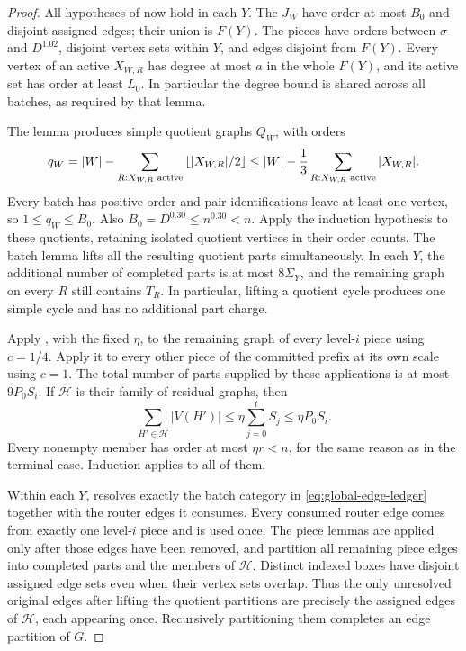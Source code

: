 \begin{proof}
All hypotheses of  now hold in each
\(Y\). The \(J_W\) have order at most \(B_0\) and disjoint
assigned edges; their union is \(F(Y)\). The pieces have
orders between \(\sigma\) and \(D^{1.02}\), disjoint vertex
sets within \(Y\), and edges disjoint from \(F(Y)\).
Every vertex of an active \(X_{W,R}\) has
degree at most \(a\) in the whole \(F(Y)\), and its active
set has order at least \(L_0\). In particular the degree bound
is shared across all batches, as required by that lemma.

The lemma produces simple quotient graphs \(Q_W\), with orders
\begin{equation}\label{eq:individual-quotient-order}
 q_W=|W|-\sum_{R:X_{W,R}\text{ active}}
                       \left\lfloor|X_{W,R}|/2\right\rfloor
 \le |W|-\frac13\sum_{R:X_{W,R}\text{ active}}|X_{W,R}|.
\end{equation}
Every batch has positive order and pair identifications leave
at least one vertex, so \(1\le q_W\le B_0\). Also
\(B_0=D^{0.30}\le n^{0.30}<n\). Apply the induction
hypothesis to these quotients, retaining isolated quotient
vertices in their order counts. The batch lemma lifts all the
resulting quotient parts simultaneously. In each \(Y\), the
additional number of completed parts is at most \(8\Sigma_Y\),
and the remaining graph on every \(R\) still contains \(T_R\).
In particular, lifting a quotient cycle produces one simple
cycle and has no additional part charge.

Apply , with the fixed \(\eta\), to
the remaining graph of every level-\(i\) piece using \(c=1/4\).
Apply it to every other piece of the committed prefix at its
own scale using \(c=1\). The total number of parts supplied
by these applications is at most \(9P_0S_i\). If
\(\mathcal H\) is their family of residual graphs, then
\begin{equation}\label{eq:piece-residual-order}
 \sum_{H'\in\mathcal H}|V(H')|
 \le\eta\sum_{j=0}^tS_j\le\eta P_0S_i.
\end{equation}
Every nonempty member has order at most \(\eta r<n\), for
the same reason as in the terminal case. Induction applies to
all of them.

Within each \(Y\),  resolves exactly
the batch category in \eqref{eq:global-edge-ledger} together
with the router edges it consumes.
Every consumed router edge comes from exactly one level-\(i\)
piece and is used once. The piece lemmas are applied only after
those edges have been removed, and partition all remaining
piece edges into completed parts and the members of
\(\mathcal H\). Distinct indexed boxes have disjoint assigned
edge sets even when their vertex sets overlap. Thus the only
unresolved original edges after lifting the quotient partitions
are precisely the assigned edges of \(\mathcal H\), each
appearing once. Recursively partitioning them completes an edge
partition of \(G\).


\end{proof}
